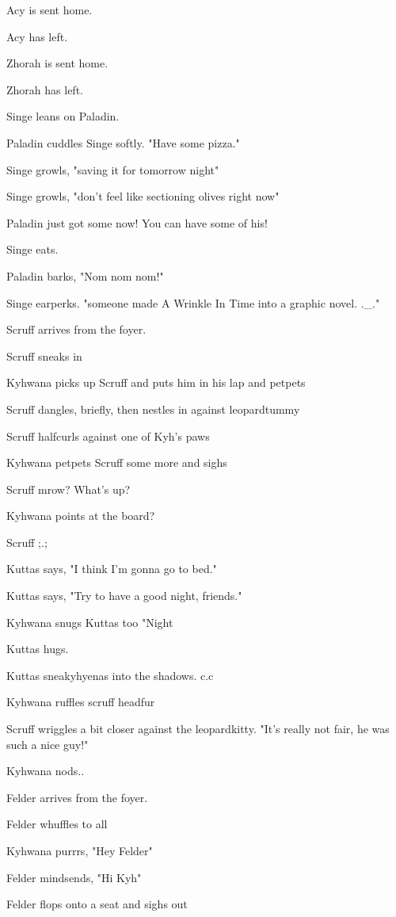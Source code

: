 \begin{hangparas}{2em}{1}
Acy is sent home.

Acy has left.

Zhorah is sent home.

Zhorah has left.

Singe leans on Paladin.

Paladin cuddles Singe softly. "Have some pizza."

Singe growls, "saving it for tomorrow night"

Singe growls, "don't feel like sectioning olives right now"

Paladin just got some now! You can have some of his!

Singe eats.

Paladin barks, "Nom nom nom!"

Singe earperks. "someone made A Wrinkle In Time into a graphic novel. .\_."

Scruff arrives from the foyer.

Scruff sneaks in

Kyhwana picks up Scruff and puts him in his lap and petpets

Scruff dangles, briefly, then nestles in against leopardtummy

Scruff halfcurls against one of Kyh's paws

Kyhwana petpets Scruff some more and sighs

Scruff mrow? What's up?

Kyhwana points at the board?

Scruff ;.;

Kuttas says, "I think I'm gonna go to bed."

Kuttas says, "Try to have a good night, friends."

Kyhwana snugs Kuttas too "Night

Kuttas hugs.

Kuttas sneakyhyenas into the shadows. c.c

Kyhwana ruffles scruff headfur

Scruff wriggles a bit closer against the leopardkitty. "It's really not fair, he was such a nice guy!"

Kyhwana nods..

Felder arrives from the foyer.

Felder whuffles to all

Kyhwana purrrs, "Hey Felder"

Felder mindsends, "Hi Kyh"

Felder flops onto a seat and sighs out


\end{hangparas}
